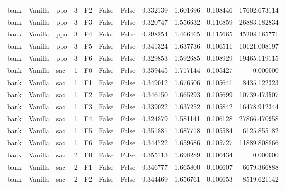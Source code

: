 \begin{tabular}{lllrlllrrrr}
      bank & Vanilla &       ppo &     3 &  F2 &           False &            False &  0.332139 &  1.601696 & 0.108446 &     17602.673114 \\
      bank & Vanilla &       ppo &     3 &  F3 &           False &            False &  0.320747 &  1.556632 & 0.110859 &     26883.182834 \\
      bank & Vanilla &       ppo &     3 &  F4 &           False &            False &  0.298254 &  1.466465 & 0.115665 &     45208.165771 \\
      bank & Vanilla &       ppo &     3 &  F5 &           False &            False &  0.341324 &  1.637736 & 0.106511 &     10121.008197 \\
      bank & Vanilla &       ppo &     3 &  F6 &           False &            False &  0.329853 &  1.592685 & 0.108929 &     19465.119115 \\
      bank & Vanilla &       sac &     1 &  F0 &           False &            False &  0.359445 &  1.717144 & 0.105427 &         0.000000 \\
      bank & Vanilla &       sac &     1 &  F1 &           False &            False &  0.349012 &  1.676506 & 0.105641 &      8435.122323 \\
      bank & Vanilla &       sac &     1 &  F2 &           False &            False &  0.346150 &  1.665293 & 0.105699 &     10739.473507 \\
      bank & Vanilla &       sac &     1 &  F3 &           False &            False &  0.339022 &  1.637252 & 0.105842 &     16478.912344 \\
      bank & Vanilla &       sac &     1 &  F4 &           False &            False &  0.324879 &  1.581141 & 0.106128 &     27866.470958 \\
      bank & Vanilla &       sac &     1 &  F5 &           False &            False &  0.351881 &  1.687718 & 0.105584 &      6125.855182 \\
      bank & Vanilla &       sac &     1 &  F6 &           False &            False &  0.344722 &  1.659686 & 0.105727 &     11889.808866 \\
      bank & Vanilla &       sac &     2 &  F0 &           False &            False &  0.355113 &  1.698289 & 0.106434 &         0.000000 \\
      bank & Vanilla &       sac &     2 &  F1 &           False &            False &  0.346777 &  1.665800 & 0.106607 &      6679.366888 \\
      bank & Vanilla &       sac &     2 &  F2 &           False &            False &  0.344469 &  1.656761 & 0.106653 &      8519.621142 \\

\end{tabular}
